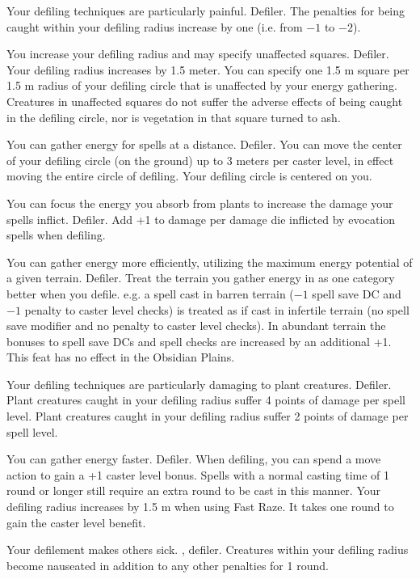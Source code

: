 
{Your defiling techniques are particularly painful.}
{Defiler.}
{The penalties for being caught within your defiling radius increase by one (i.e. from $-1$ to $-2$).}
{}{}

{You increase your defiling radius and may specify unaffected squares.}
{Defiler.}
{Your defiling radius increases by 1.5 meter. You can specify one 1.5 m square per 1.5 m radius of your defiling circle that is unaffected by your energy gathering. Creatures in unaffected squares do not suffer the adverse effects of being caught in the defiling circle, nor is vegetation in that square turned to ash.}
{}{}

{You can gather energy for spells at a distance.}
{Defiler.}
{You can move the center of your defiling circle (on the ground) up to 3 meters per caster level, in effect moving the entire circle of defiling.}
{Your defiling circle is centered on you.}
{}

{You can focus the energy you absorb from plants to increase the damage your spells inflict.}
{Defiler.}
{Add +1 to damage per damage die inflicted by evocation spells when defiling.}
{}{}

{You can gather energy more efficiently, utilizing the maximum energy potential of a given terrain.}
{Defiler.}
{Treat the terrain you gather energy in as one category better when you defile. e.g. a spell cast in barren terrain ($-1$ spell save DC and $-1$ penalty to caster level checks) is treated as if cast in infertile terrain (no spell save modifier and no penalty to caster level checks). In abundant terrain the bonuses to spell save DCs and spell checks are increased by an additional +1. This feat has no effect in the Obsidian Plains.}
{}{}

{Your defiling techniques are particularly damaging to plant creatures.}
{Defiler.}
{Plant creatures caught in your defiling radius suffer 4 points of damage per spell level.}
{Plant creatures caught in your defiling radius suffer 2 points of damage per spell level.}
{}

{You can gather energy faster.}
{Defiler.}
{When defiling, you can spend a move action to gain a +1 caster level bonus. Spells with a normal casting time of 1 round or longer still require an extra round to be cast in this manner. Your defiling radius increases by 1.5 m when using Fast Raze.}
{It takes one round to gain the caster level benefit.}
{}

{Your defilement makes others sick.}
{, defiler.}
{Creatures within your defiling radius become nauseated in addition to any other penalties for 1 round.}
{}{}